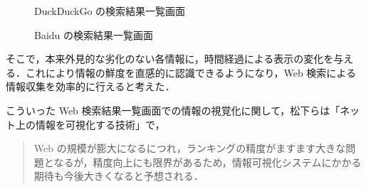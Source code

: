 \begin{figure}[htbp]
  \begin{minipage}{0.5\hsize}
    \begin{center}
    \end{center}
    \caption{DuckDuckGo の検索結果一覧画面}
  \end{minipage}
  \begin{minipage}{0.5\hsize}
    \begin{center}
    \end{center}
    \caption{Baidu の検索結果一覧画面}
  \end{minipage}
\end{figure}

そこで，本来外見的な劣化のない各情報に，時間経過による表示の変化を与える．これにより情報の鮮度を直感的に認識できるようになり，Web 検索による情報収集を効率的に行えると考えた．

こういった Web 検索結果一覧画面での情報の視覚化に関して，松下らは「ネット上の情報を可視化する技術」\cite{tecvisinfo}で，

\begin{quote}
  Web の規模が膨大になるにつれ，ランキングの精度がますます大きな問題となるが，精度向上にも限界があるため，情報可視化システムにかかる期待も今後大きくなると予想される．
\end{quote}


